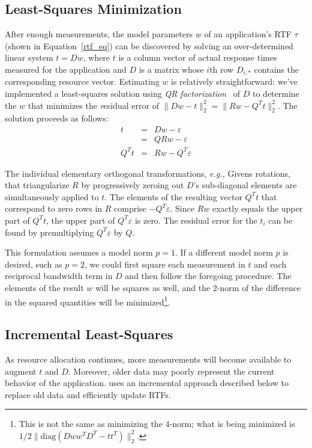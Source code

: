 \subsection*{Least-Squares Minimization}
After enough measurements, the model parameters $w$ of an application's RTF $\tau$ (shown in Equation~\ref{rtf_eq})
can be discovered by solving an over-determined linear system $t=Dw$,
where $t$ is a column vector of actual response times measured for the application
and $D$ is a matrix whose $i$th row $D_{i,*}$ contains the corresponding resource vector.
Estimating $w$ is relatively straightforward: we've implemented a least-squares solution using
\emph{QR factorization}~\cite{GoVL} of $D$ to determine the $w$ that minimizes the \emph residual error of
$\|Dw - t\|^2_2 =  \|Rw - Q^Tt\|^2_2$.
The solution proceeds as follows:
\begin{eqnarray*}
t     &=& Dw  - \varepsilon    \\
      &=& QRw - \varepsilon    \\
Q^Tt  &=& Rw  - Q^T\varepsilon
\end{eqnarray*}

The individual elementary orthogonal transformations, \emph{e.g.,} Givens rotations,
that triangularize $R$ by progressively zeroing out $D$'s sub-diagonal elements are simultaneously applied to $t$.
The elements of the resulting vector $Q^Tt$ that correspond to zero rows in $R$ comprise $-Q^T\varepsilon$.
Since $Rw$ exactly equals the upper part of $Q^Tt$, the upper part of $Q^T\varepsilon$ is zero. The residual error for the $t_i$
can be found by premultiplying $Q^T\varepsilon$ by $Q$.

This formulation assumes a model norm $p = 1$. If a different model norm $p$ is desired, such as $p = 2$, we could first square each measurement in $t$
and each reciprocal bandwidth term in $D$ and then follow the foregoing procedure.
The elements of the result $w$ will be squares as well, and the 2-norm of the difference in the squared quantities will be minimized\footnote{This is not the same as minimizing the 4-norm; what is being minimized is $1/2\|\mbox{diag}(Dww^TD^T - tt^T)\|^2_2$.}.

\subsection*{Incremental Least-Squares}
As resource allocation continues, more measurements will become available to augment $t$ and $D$.
Moreover, older data may poorly represent the current behavior of the application.
\pacora uses an incremental approach described below to replace old data and efficiently update RTFs.

